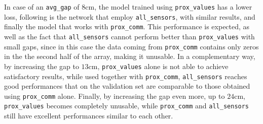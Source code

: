 In case of an \texttt{avg\_gap} of $8$\gls{cm}, the model trained using 
\texttt{prox\_values} has a lower loss, following is the network that employ 
\texttt{all\_sensors}, with similar results, and finally the model that works with 
\texttt{prox\_comm}.
This performance is expected, as well as the fact that \texttt{all\_sensors} cannot 
perform better than \texttt{prox\_values} with small gaps, since in this case the 
data coming from \texttt{prox\_comm} contains only zeros in the the second half 
of the array, making it unusable.
In a complementary way, by increasing the gap to $13$\gls{cm},  
\texttt{prox\_values} alone is not able to achieve satisfactory results, while used 
together with \texttt{prox\_comm}, \texttt{all\_sensors} reaches good 
performances that on the validation set are comparable to those obtained using 
\texttt{prox\_comm} alone.
Finally, by increasing the gap even more, up to $24$\gls{cm}, 
\texttt{prox\_values} becomes completely unusable, while \texttt{prox\_comm} 
and \texttt{all\_sensors} still have excellent performances similar to each other.


